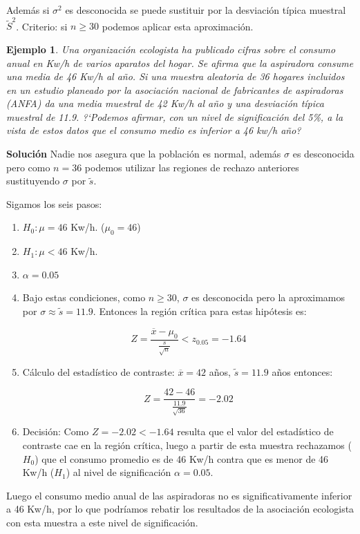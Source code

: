 \documentclass[12pt]{report}
\newtheorem{example}[definition]{Ejemplo}
\begin{document}
    Además si $\sigma^2$ es desconocida se puede sustituir por la
    desviación típica muestral $\tilde{S}^2$. Criterio: si $n\geq 30$ podemos
    aplicar esta aproximación.
    \begin{example}
   Una organización ecologista ha publicado cifras sobre el consumo anual en Kw/h
   de varios aparatos del hogar. Se afirma que la
   aspiradora consume una media de 46 Kw/h al año. Si una muestra
   aleatoria de 36 hogares incluidos en un estudio planeado por
   la asociación nacional de fabricantes de aspiradoras (ANFA) da una
   media muestral de 42 Kw/h al año y una desviación típica muestral
   de 11.9. ?`Podemos
   afirmar, con un nivel de significación del 5\%,
   a la vista de estos datos que  el consumo medio es inferior
   a 46 kw/h año?
\end{example}
\textbf{Solución} Nadie nos asegura que la población es normal, además $\sigma$ es
desconocida pero como $n=36$ podemos utilizar las regiones de rechazo anteriores
sustituyendo $\sigma$ por $\tilde{s}$.

  Sigamos los seis pasos:
\begin{enumerate}[1)]
 \item $H_{0}:\mu=46$ Kw/h. ($\mu_{0}=46$)  
\item $H_{1}:\mu<46$ Kw/h.  
 \item $\alpha=0.05$  
 \item Bajo estas condiciones, como $n\geq 30$, $\sigma$ es desconocida
 pero la aproximamos por $\sigma\approx \tilde{s}=11.9$.
 Entonces la región crítica para estas
 hipótesis es:

 $$Z=\frac{\overline{x}-\mu_{0}}{\frac{s}{\sqrt{n}}}<z_{0.05}=-1.64$$

 \item Cálculo del estadístico de contraste:
 $\overline{x}=42$ años, $\tilde{s}=11.9$ años entonces:

 $$Z=\frac{42-46}{\frac{11.9}{\sqrt{36}}}=-2.02$$

\item Decisión: Como $Z=-2.02<-1.64$ resulta que el valor del estadístico
 de contraste cae  en la región crítica, luego  a partir de esta
 muestra rechazamos
  ($H_{0}$) que el consumo promedio es de 46 Kw/h  contra que es
 menor de 46 Kw/h ($H_{1}$) al nivel de significación $\alpha=0.05$.
\end{enumerate}


 Luego el consumo medio anual de las aspiradoras no es
 significativamente inferior a 46 Kw/h, por lo que
 podríamos rebatir los resultados de la asociación
 ecologista con esta muestra a este nivel de significación.
 
\end{document}
